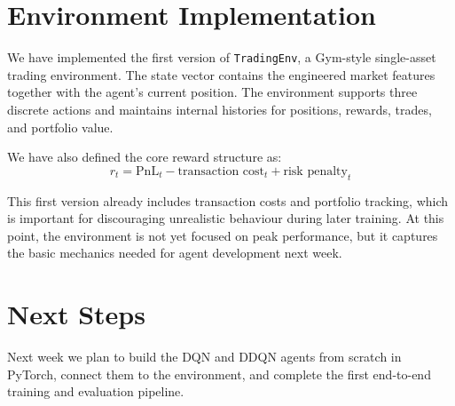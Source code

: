 \documentclass[11pt,twocolumn]{article}
\begin{document}
\section{Environment Implementation}

We have implemented the first version of \texttt{TradingEnv}, a Gym-style single-asset trading environment. The state vector contains the engineered market features together with the agent's current position. The environment supports three discrete actions and maintains internal histories for positions, rewards, trades, and portfolio value.

We have also defined the core reward structure as:
\begin{equation}
  r_t = \text{PnL}_t - \text{transaction cost}_t + \text{risk penalty}_t
\end{equation}

This first version already includes transaction costs and portfolio tracking, which is important for discouraging unrealistic behaviour during later training. At this point, the environment is not yet focused on peak performance, but it captures the basic mechanics needed for agent development next week.

\section{Next Steps}

Next week we plan to build the DQN and DDQN agents from scratch in PyTorch, connect them to the environment, and complete the first end-to-end training and evaluation pipeline.
\end{document}
